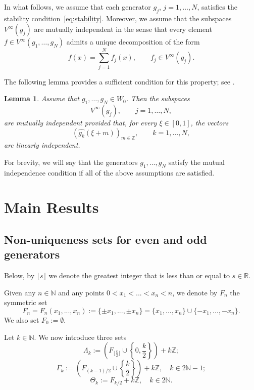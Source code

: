\documentclass[12pt]{amsart}
\numberwithin{equation}{section}
\newtheorem{lemma}[theorem]{Lemma}
\newcommand{\R}{{\mathbb R}} \newcommand{\Q}{{\mathbb Q}} \newcommand{\Z}{{\mathbb Z}} \newcommand{\N}{{\mathbb N}}
\begin{document}
In what follows, we assume that each generator $g_j$, $j=1,\dots,N$, satisfies the stability condition~\eqref{eq:stability}. Moreover, we assume that the subspaces $V^{\infty}(g_j)$ are mutually independent in the sense that every element $f\in V^\infty(g_1,\dots,g_N)$ admits a unique decomposition of the form
$$
f(x)=\sum_{j=1}^N f_j(x),
\qquad
f_j\in V^\infty(g_j).
$$

The following lemma provides a sufficient condition for this property; see \cite{MR1850960}.

\begin{lemma}\label{lem:mutual_stable}
Assume that $g_1,\dots,g_N\in W_0$. Then the subspaces
$$
V^\infty(g_j), \qquad j=1,\dots,N,
$$
are mutually independent provided that, for every $\xi\in[0,1]$, the vectors
$$
\left(\widehat{g_k}(\xi+m)\right)_{m\in\Z},
\qquad k=1,\dots,N,
$$
are linearly independent.
\end{lemma}

For brevity, we will say that the generators $g_1,\dots,g_N$ satisfy the mutual independence condition if all of the above assumptions are satisfied.


\section{Main Results}
\subsection{Non-uniqueness sets for even and odd generators}
Below, by $\lfloor s \rfloor$ we denote the greatest integer that is less than or equal to $s\in \R.$

 Given any $n\in \N$ and any points $0<x_1<...<x_{n} <n$, we denote by $F_{n}$ the symmetric set
\begin{equation}\label{eq:set_F_def}
   F_n=F_n(x_1,...,x_n):=\{\pm x_1,...,\pm x_n\}=\{x_1,...,x_n\}\cup \{-x_1,...,-x_n\}. 
\end{equation}
We also set $F_0:=\emptyset.$

Let $k\in\mathbb N$. We now introduce three sets
\begin{equation}\label{eq:set_Lambda_def}
\Lambda_k:=\left(F_{\lfloor\frac{k}{2}\rfloor} \cup \left\{0,\frac{k}{2}\right\}\right)+k\Z;
\end{equation}
\begin{equation}\label{eq:set_Gamma_def}
\Gamma_k:= \left(F_{(k-1)/2}\cup \left\{\frac{k}{2}\right\}\right)+k\Z,\quad k\in 2\N-1; 
\end{equation}
\begin{equation}\label{eq:set_Theta_def}
\Theta_k:=F_{k/2}+k\Z,\quad k\in 2\N.
\end{equation}
\end{document}
